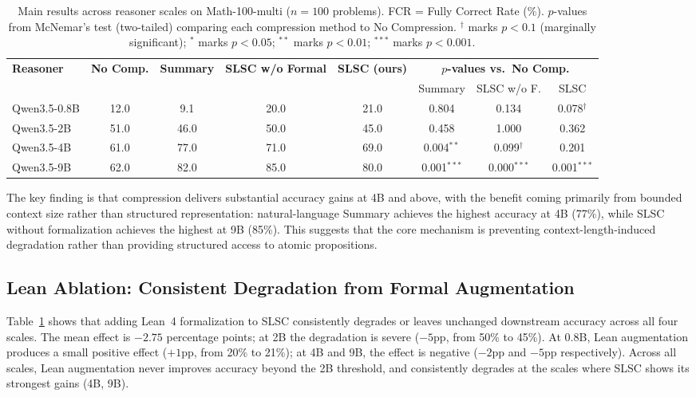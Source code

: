 \begin{table}[t]
  \centering
  \small
  \caption{Main results across reasoner scales on Math-100-multi ($n=100$ problems). FCR = Fully Correct Rate (\%). $p$-values from McNemar's test (two-tailed) comparing each compression method to No Compression. $^\dagger$ marks $p < 0.1$ (marginally significant); $^{*}$ marks $p < 0.05$; $^{**}$ marks $p < 0.01$; $^{***}$ marks $p < 0.001$.}
  \label{tab:main}
  \begin{tabular}{lccccccc}
    \toprule
    \textbf{Reasoner} & \textbf{No Comp.} & \textbf{Summary} & \textbf{SLSC w/o Formal} & \textbf{SLSC (ours)} & \multicolumn{3}{c}{\textbf{$p$-values vs.\ No Comp.}} \\
    \cmidrule(lr){6-8}
    & & & & & Summary & SLSC w/o F. & SLSC \\
    \midrule
    Qwen3.5-0.8B & 12.0 & 9.1  & 20.0 & 21.0 & 0.804 & 0.134 & 0.078$^\dagger$ \\
    Qwen3.5-2B   & 51.0 & 46.0 & 50.0 & 45.0 & 0.458 & 1.000 & 0.362 \\
    Qwen3.5-4B   & 61.0 & 77.0 & 71.0 & 69.0 & 0.004$^{**}$ & 0.099$^\dagger$ & 0.201 \\
    Qwen3.5-9B   & 62.0 & 82.0 & 85.0 & 80.0 & 0.001$^{***}$ & 0.000$^{***}$ & 0.001$^{***}$ \\
    \bottomrule
  \end{tabular}
\end{table}

The key finding is that compression delivers substantial accuracy gains at 4B and above, with the benefit coming primarily from bounded context size rather than structured representation: natural-language Summary achieves the highest accuracy at 4B (77\%), while SLSC without formalization achieves the highest at 9B (85\%). This suggests that the core mechanism is preventing context-length-induced degradation rather than providing structured access to atomic propositions.


\subsection{Lean Ablation: Consistent Degradation from Formal Augmentation}
\label{sec:lean_ablation}

Table~\ref{tab:main} shows that adding Lean~4 formalization to SLSC consistently degrades or leaves unchanged downstream accuracy across all four scales. The mean effect is $-2.75$ percentage points; at 2B the degradation is severe ($-5$pp, from 50\% to 45\%). At 0.8B, Lean augmentation produces a small positive effect ($+1$pp, from 20\% to 21\%); at 4B and 9B, the effect is negative ($-2$pp and $-5$pp respectively). Across all scales, Lean augmentation never improves accuracy beyond the 2B threshold, and consistently degrades at the scales where SLSC shows its strongest gains (4B, 9B).

